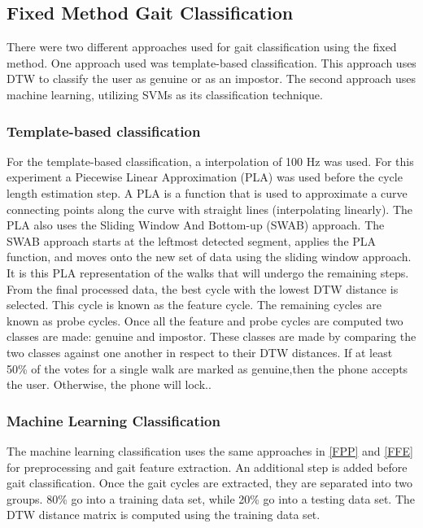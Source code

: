 \documentclass{sig-alternate}
\begin{document}
\subsection{Fixed Method Gait Classification}
There were two different approaches used for gait classification using the fixed method. One approach used was template-based classification. This approach uses DTW to classify the user as genuine or as an impostor. The second approach uses machine learning, utilizing SVMs as its classification technique. 
\subsubsection{Template-based classification}
	 For the template-based classification, a interpolation of 100 Hz was used. For this experiment a Piecewise Linear Approximation (PLA) was used before the cycle length estimation step. A PLA is a function that is used to approximate a curve connecting points along the curve with straight lines (interpolating linearly). The PLA also uses the Sliding Window And Bottom-up (SWAB) approach. The SWAB approach starts at the leftmost detected segment, applies the PLA function, and moves onto the new set of data using the sliding window approach. It is this PLA representation of the walks that will undergo the remaining steps. From the final processed data, the best cycle with the lowest DTW distance is selected. This cycle is known as the feature cycle. The remaining cycles are known as probe cycles. Once all the feature and probe cycles are computed two classes are made: genuine and impostor. These classes are made by comparing the two classes against one another in respect to their DTW distances. If at least 50\% of the votes for a single walk are marked as genuine,then the phone accepts the user. Otherwise, the phone will lock.. 


\subsubsection{Machine Learning Classification}
	The machine learning classification uses the same approaches in \ref{FPP} and \ref{FFE} for preprocessing and gait feature extraction. An additional step is added before gait classification. Once the gait cycles are extracted, they are separated into two groups. 80\% go into a training data set, while 20\% go into a testing data set. The DTW distance matrix is computed using the training data set.
\end{document}
